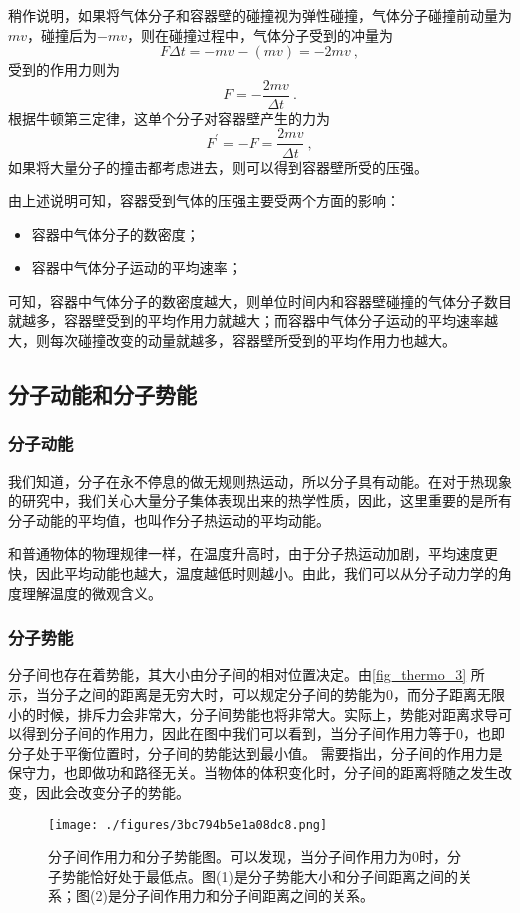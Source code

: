 稍作说明，如果将气体分子和容器壁的碰撞视为弹性碰撞，气体分子碰撞前动量为$mv$，碰撞后为$-mv$，则在碰撞过程中，气体分子受到的冲量为
$$F\Delta t=-mv-(mv)=-2mv~,$$
受到的作用力则为
$$F=-\dfrac{2mv}{\Delta t}~.$$
根据牛顿第三定律，这单个分子对容器壁产生的力为
$$F^\prime=-F=\dfrac{2mv}{\Delta t}~,$$
如果将大量分子的撞击都考虑进去，则可以得到容器壁所受的压强。

由上述说明可知，容器受到气体的压强主要受两个方面的影响：
\begin{itemize}
\item 容器中气体分子的数密度；
\item 容器中气体分子运动的平均速率；
\end{itemize}
可知，容器中气体分子的数密度越大，则单位时间内和容器壁碰撞的气体分子数目就越多，容器壁受到的平均作用力就越大；而容器中气体分子运动的平均速率越大，则每次碰撞改变的动量就越多，容器壁所受到的平均作用力也越大。

\subsection{分子动能和分子势能}
\subsubsection{分子动能}
我们知道，分子在永不停息的做无规则热运动，所以分子具有动能。在对于热现象的研究中，我们关心大量分子集体表现出来的热学性质，因此，这里重要的是所有分子动能的平均值，也叫作分子热运动的平均动能。

和普通物体的物理规律一样，在温度升高时，由于分子热运动加剧，平均速度更快，因此平均动能也越大，温度越低时则越小。由此，我们可以从分子动力学的角度理解温度的微观含义。

\subsubsection{分子势能}
分子间也存在着势能，其大小由分子间的相对位置决定。由\autoref{fig_thermo_3} 所示，当分子之间的距离是无穷大时，可以规定分子间的势能为$0$，而分子距离无限小的时候，排斥力会非常大，分子间势能也将非常大。实际上，势能对距离求导可以得到分子间的作用力，因此在图中我们可以看到，当分子间作用力等于$0$，也即分子处于平衡位置时，分子间的势能达到最小值。
需要指出，分子间的作用力是保守力，也即做功和路径无关。当物体的体积变化时，分子间的距离将随之发生改变，因此会改变分子的势能。

\begin{figure}[ht]
\centering
\texttt{[image: ./figures/3bc794b5e1a08dc8.png]}
\caption{分子间作用力和分子势能图。可以发现，当分子间作用力为$0$时，分子势能恰好处于最低点。图(1)是分子势能大小和分子间距离之间的关系；图(2)是分子间作用力和分子间距离之间的关系。} \label{fig_thermo_3}
\end{figure}

